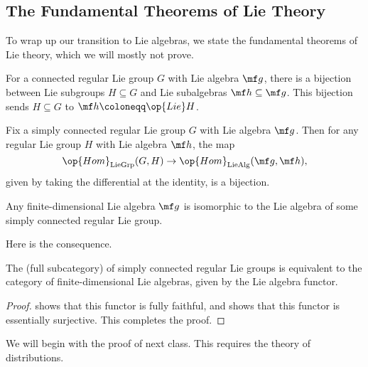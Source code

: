 \documentclass[../notes.tex]{subfiles}
\begin{document}
\subsection{The Fundamental Theorems of Lie Theory}
To wrap up our transition to Lie algebras, we state the fundamental theorems of Lie theory, which we will mostly not prove.
\begin{theorem} \label{thm:lie-1}
	For a connected regular Lie group $G$ with Lie algebra $\mf g$, there is a bijection between Lie subgroups $H\subseteq G$ and Lie subalgebras $\mf h\subseteq\mf g$. This bijection sends $H\subseteq G$ to $\mf h\coloneqq\op{Lie}H$.
\end{theorem}
\begin{theorem} \label{thm:lie-2}
	Fix a simply connected regular Lie group $G$ with Lie algebra $\mf g$. Then for any regular Lie group $H$ with Lie algebra $\mf h$, the map
	\[\op{Hom}_{\mathrm{LieGrp}}(G,H)\to\op{Hom}_{\mathrm{LieAlg}}(\mf g,\mf h),\]
	given by taking the differential at the identity, is a bijection.
\end{theorem}
\begin{theorem} \label{thm:lie-3}
	Any finite-dimensional Lie algebra $\mf g$ is isomorphic to the Lie algebra of some simply connected regular Lie group.
\end{theorem}
Here is the consequence.
\begin{corollary}
	The (full subcategory) of simply connected regular Lie groups is equivalent to the category of finite-dimensional Lie algebras, given by the Lie algebra functor.
\end{corollary}
\begin{proof}
	 shows that this functor is fully faithful, and  shows that this functor is essentially surjective. This completes the proof.
\end{proof}
We will begin with the proof of  next class. This requires the theory of distributions.
\end{document}
